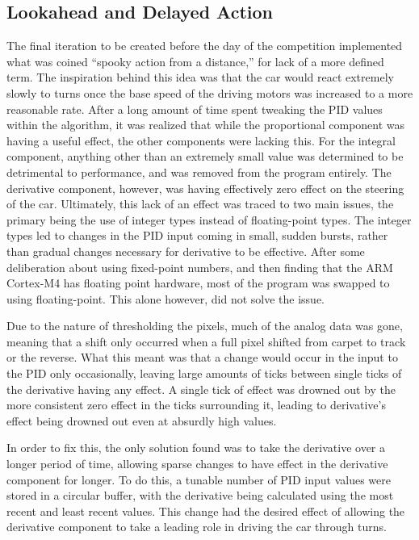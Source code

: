 \documentclass[conference]{IEEEtran}
\begin{document}
\subsection{Lookahead and Delayed Action}
    The final iteration to be created before the day of the competition implemented what was coined ``spooky action from a distance,'' for lack of a more
    defined term. 
    The inspiration behind this idea was that the car would react extremely slowly to turns once the base speed of the driving motors was increased to
    a more reasonable rate.
    After a long amount of time spent tweaking the PID values within the algorithm, it was realized that while the proportional component was having a
    useful effect, the other components were lacking this. For the integral component, anything other than an extremely small value was determined to
    be detrimental to performance, and was removed from the program entirely. The derivative component, however, was having effectively zero effect
    on the steering of the car.
    Ultimately, this lack of an effect was traced to two main issues, the primary being the use of integer types instead of floating-point types.
    The integer types led to changes in the PID input coming in small, sudden bursts, rather than gradual changes necessary for derivative to be effective.
    After some deliberation about using fixed-point numbers, and then finding that the ARM Cortex-M4 has floating point hardware, most of the
    program was swapped to using floating-point. This alone however, did not solve the issue.

    Due to the nature of thresholding the pixels, much of the analog data was gone, meaning that a shift only occurred when a full pixel shifted from
    carpet to track or the reverse. What this meant was that a change would occur in the input to the PID only occasionally, leaving large amounts
    of ticks between single ticks of the derivative having any effect. A single tick of effect was drowned out by the more consistent zero effect
    in the ticks surrounding it, leading to derivative's effect being drowned out even at absurdly high values.

    In order to fix this, the only solution found was to take the derivative over a longer period of time, allowing sparse changes to have effect in the
    derivative component for longer. To do this, a tunable number of PID input values were stored in a circular buffer, with the derivative being
    calculated using the most recent and least recent values.
    This change had the desired effect of allowing the derivative component to take a leading role in driving the car through turns.
\end{document}
